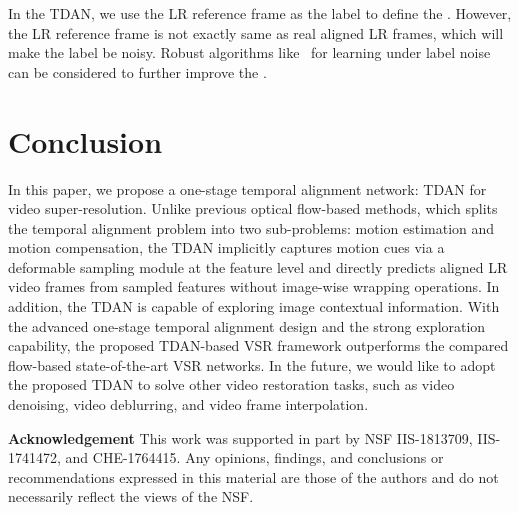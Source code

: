 \documentclass[10pt,twocolumn,letterpaper]{article}
\begin{document}
In the TDAN, we use the LR reference frame as the label to define the . However, the LR reference frame is not exactly same as real aligned LR frames, which will make the label be noisy. Robust algorithms like~\cite{natarajan2013learning} for learning under label noise can be considered to further improve the .


\section{Conclusion}
In this paper, we propose a one-stage temporal alignment network: TDAN for video super-resolution. Unlike previous optical flow-based methods, which splits the temporal alignment problem into two sub-problems: motion estimation and motion compensation, the TDAN implicitly captures motion cues via a deformable sampling module at the feature level and directly predicts aligned LR video frames from sampled features without image-wise wrapping operations. In addition, the TDAN is capable of exploring image contextual information. With the advanced one-stage temporal alignment design and the strong exploration capability, the proposed TDAN-based VSR framework outperforms the compared flow-based state-of-the-art VSR networks. In the future, we would like to adopt the proposed TDAN to solve other video restoration tasks, such as video denoising, video deblurring, and video frame interpolation.

\noindent \textbf{Acknowledgement}
This work was supported in part by NSF IIS-1813709, IIS-1741472, and CHE-1764415. Any opinions, findings, and conclusions or recommendations expressed in this material are those of the authors and do not necessarily reflect the views of the NSF.
{\small


}
\end{document}
